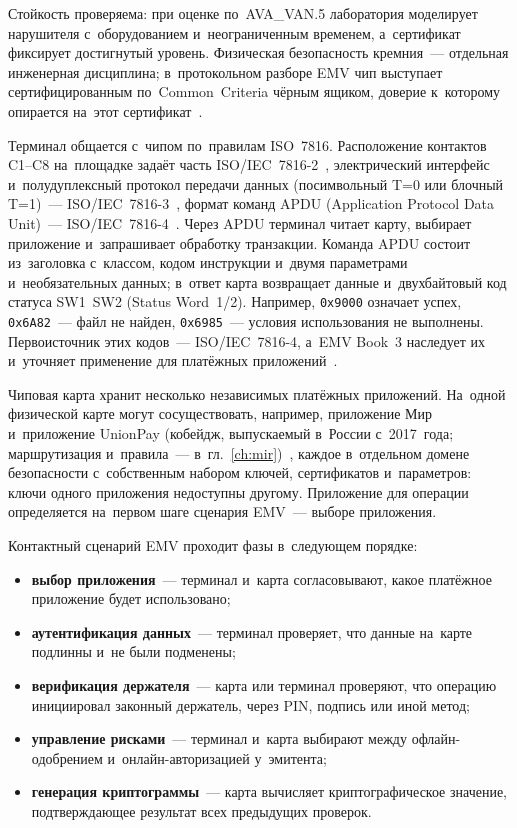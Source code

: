 Стойкость проверяема: при оценке по~AVA\_VAN.5 лаборатория моделирует
нарушителя с~оборудованием и~неограниченным временем, а~сертификат фиксирует
достигнутый уровень. Физическая безопасность кремния~--- отдельная инженерная
дисциплина; в~протокольном разборе EMV чип выступает сертифицированным
по~Common~Criteria чёрным ящиком, доверие к~которому опирается на~этот
сертификат~\cite{cc-pp-0084}.

Терминал общается с~чипом по~правилам ISO~7816. Расположение контактов
C1--C8 на~площадке задаёт часть ISO/IEC~7816-2~\cite{iso-7816-2}, электрический
интерфейс и~полудуплексный протокол передачи данных (посимвольный T=0 или
блочный T=1)~--- ISO/IEC~7816-3~\cite{iso-7816-3}, формат команд APDU
(Application Protocol Data Unit)~--- ISO/IEC~7816-4~\cite{iso-7816-4}. Через APDU
терминал читает карту, выбирает приложение и~запрашивает обработку транзакции.
Команда APDU состоит из~заголовка с~классом, кодом инструкции и~двумя
параметрами и~необязательных данных; в~ответ карта возвращает данные
и~двухбайтовый код статуса SW1~SW2 (Status Word~1/2). Например, \texttt{0x9000}
означает успех, \texttt{0x6A82}~--- файл не найден, \texttt{0x6985}~--- условия
использования не выполнены. Первоисточник этих кодов~--- ISO/IEC~7816-4, а~EMV
Book~3 наследует их и~уточняет применение для платёжных
приложений~\cite{iso-7816-4,emvco-book3}.

Чиповая карта хранит несколько независимых платёжных приложений. На~одной
физической карте могут сосуществовать, например, приложение Мир и~приложение
UnionPay (кобейдж, выпускаемый в~России с~2017~года; маршрутизация
и~правила~--- в~гл.~\ref{ch:mir})~\cite{unionpayintl-nspk-card-issuance}, каждое в~отдельном
домене безопасности с~собственным набором ключей, сертификатов и~параметров:
ключи одного приложения недоступны другому. Приложение для операции
определяется на~первом шаге сценария EMV~--- выборе приложения.

Контактный сценарий EMV проходит фазы в~следующем порядке:

\begin{itemize}
  \item \textbf{выбор приложения}~--- терминал и~карта согласовывают, какое
    платёжное приложение будет использовано;
  \item \textbf{аутентификация данных}~--- терминал проверяет, что данные
    на~карте подлинны и~не были подменены;
  \item \textbf{верификация держателя}~--- карта или терминал проверяют, что
    операцию инициировал законный держатель, через PIN, подпись или иной
    метод;
  \item \textbf{управление рисками}~--- терминал и~карта выбирают между
    офлайн-одобрением и~онлайн-авторизацией у~эмитента;
  \item \textbf{генерация криптограммы}~--- карта вычисляет криптографическое
    значение, подтверждающее результат всех предыдущих проверок.
\end{itemize}

